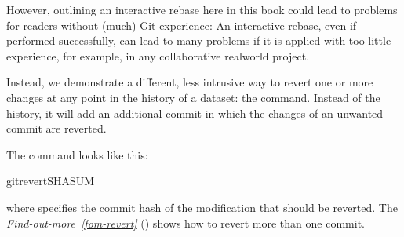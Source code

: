 \sphinxAtStartPar
However, outlining an interactive rebase here in this book could lead to
problems for readers without (much) Git experience: An interactive rebase,
even if performed successfully, can lead to many problems if it is applied with
too little experience, for example, in any collaborative real\sphinxhyphen{}world project.

\ignorespaces 
\sphinxAtStartPar
Instead, we demonstrate a different, less intrusive way to revert one or more
changes at any point in the history of a dataset: the 
command.
Instead of  the history, it will add an additional commit in which
the changes of an unwanted commit are reverted.

\sphinxAtStartPar
The command looks like this:

\begin{sphinxVerbatim}[commandchars=\\\{\}]
gitrevertSHASUM
\end{sphinxVerbatim}

\sphinxAtStartPar
where  specifies the commit hash of the modification that should
be reverted. The \textit{Find-out-more}~{\findoutmoreiconinline}\textit{\ref{fom-revert}} {\hyperref[\detokenize{basics/101-137-history:fom-revert}]{}} () shows how to revert
more than one commit.

